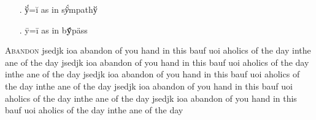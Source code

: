 {	\begin{itemize}[leftmargin={-3pt}]
		\item[.] \'ў=ĭ as in s\textit{\'ў}mpathў 
		\item[.] \=y=ī  as in b{\unifont \textbf{\'ȳ}}p\"ass  %
	\end{itemize}	
}


\lettrine{A}{bandon} jsedjk  ioa  abandon of  you hand in this bauf uoi aholics of the day inthe ane of the day
jsedjk  ioa  abandon of  you hand in this bauf uoi aholics of the day inthe ane of the day
jsedjk  ioa  abandon of  you hand in this bauf uoi aholics of the day inthe ane of the day
jsedjk  ioa  abandon of  you hand in this bauf uoi aholics of the day inthe ane of the day
jsedjk  ioa  abandon of  you hand in this bauf uoi aholics of the day inthe ane of the day